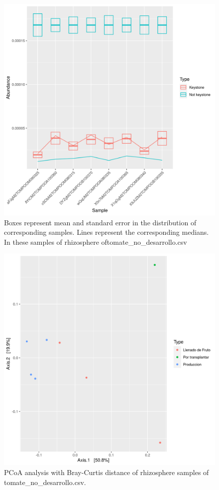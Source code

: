 \begin{figure}
 \centering
 \includegraphics[scale = 0.75]{mean_median_key_vs_not_key_tomate_no_desarrollo.csv.png}
\caption{Boxes represent mean and standard error in the distribution of corresponding samples. Lines represent the corresponding medians. In these samples of rhizosphere oftomate_no_desarrollo.csv}
\label{mean_median_tomate_no_desarrollo.csv}
\end{figure}
\begin{figure}
   \centering
   \includegraphics[scale = 0.7]{pcoa_muestras_tomate_no_desarrollo.csv.png}
 \caption{PCoA analysis with Bray-Curtis distance of rhizosphere samples of tomate_no_desarrollo.csv.}
 \label{fig:tomate_no_desarrollo.csv_pcoa}
\end{figure}
